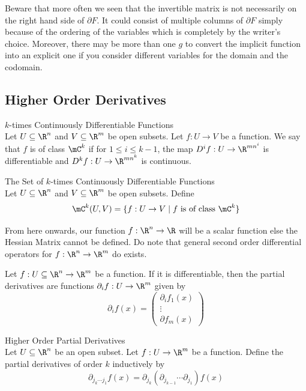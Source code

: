 \documentclass[a4paper]{article}
\begin{document}
Beware that more often we seen that the invertible matrix is not necessarily on the right hand side of $\partial F$. It could consist of multiple columns of $\partial F$ simply because of the ordering of the variables which is completely by the writer's choice. Moreover, there may be more than one $g$ to convert the implicit function into an explicit one if you consider different variables for the domain and the codomain. 

\subsection{Higher Order Derivatives}
\begin{defn}{$k$-times Continuously Differentiable Functions}{}\\
Let $U\subseteq\R^n$ and $V\subseteq\R^m$ be open subsets. Let $f:U\to V$ be a function. We say that $f$ is of class $\mC^k$ if for $1\leq i\leq k-1$, the map $D^if:U\to\R^{mn^i}$ is differentiable and $D^kf:U\to\R^{mn^k}$ is continuous. 
\end{defn}

\begin{defn}{The Set of $k$-times Continuously Differentiable Functions}{}\\
Let $U\subseteq\R^n$ and $V\subseteq\R^m$ be open subsets. Define $$\mC^k(U,V)=\{f:U\to V\;|\;f\text{ is of class }\mC^k\}$$
\end{defn}

From here onwards, our function $f:\R^n\to\R$ will be a scalar function else the Hessian Matrix cannot be defined. Do note that general second order differential operators for $f:\R^n\to\R^m$ do exists. 

Let $f:U\subseteq\R^n\to\R^m$ be a function. If it is differentiable, then the partial derivatives are functions $\partial_if:U\to\R^m$ given by $$\partial_if(x)=\begin{pmatrix}
\partial_if_1(x)\\\vdots\\\partial f_m(x)
\end{pmatrix}$$

\begin{defn}{Higher Order Partial Derivatives}{}\\
Let $U\subseteq\R^n$ be an open subset. Let $f:U\to\R^m$ be a function. Define the partial derivatives of order $k$ inductively by $$\partial_{j_k\cdots j_1}f(x)=\partial_{j_k}(\partial_{j_{k-1}}\cdots\partial_{j_1})f(x)$$
\end{defn}
\end{document}
